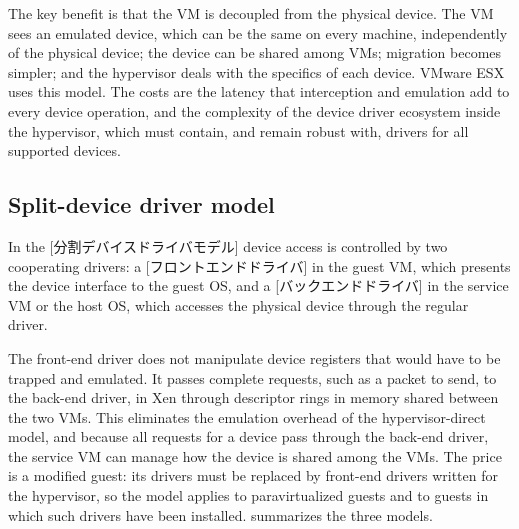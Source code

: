 \documentclass[../main.tex]{subfiles}
\begin{document}
The key benefit is that the VM is decoupled from the physical
device.  The
VM sees an emulated device, which can be the same on every machine,
independently of the physical device; the device can be shared among VMs;
migration becomes simpler; and the hypervisor deals with the specifics of
each device.  VMware ESX uses this model.  The costs are the latency that
interception and emulation add to every device operation, and the
complexity of the device driver ecosystem inside the hypervisor, which must
contain, and remain robust with, drivers for all supported devices.

\subsection{Split-device driver model}

\begin{definition}
  In the [分割デバイスドライバモデル]
  device access is controlled by two cooperating drivers: a
  [フロントエンドドライバ] in the guest VM, which
  presents the device interface to the guest OS, and a
  [バックエンドドライバ] in the service VM or the
  host OS, which accesses the physical device through the regular driver.
\end{definition}

The front-end driver does not manipulate device registers that would have
to be trapped and emulated.  It passes complete requests, such as a packet
to send, to the back-end driver, in Xen through descriptor rings in memory
shared between the two VMs.  This eliminates the
emulation overhead of the hypervisor-direct model, and because all requests
for a device pass through the back-end driver, the service VM can manage how
the device is shared among the VMs.  The price is a modified guest: its
drivers must be replaced by front-end drivers written for the hypervisor, so
the model
applies to paravirtualized guests and to guests in which such drivers have
been installed.   summarizes the three models.
\end{document}
